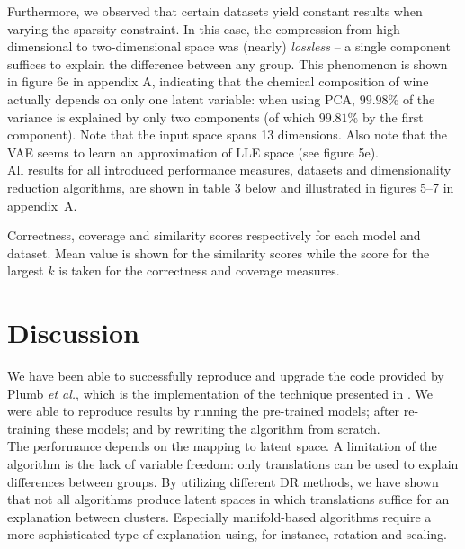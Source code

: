 Furthermore, we observed that certain datasets yield constant results when varying the sparsity-constraint. In this case, the compression from high-dimensional to two-dimensional space was (nearly) \textit{lossless} -- a single component suffices to explain the difference between any group. This phenomenon is shown in figure 6e in appendix A, indicating that the chemical composition of wine actually depends on only one latent variable: when using PCA, $99.98\%$ of the variance is explained by only two components (of which $99.81\%$ by the first component). Note that the input space spans 13 dimensions. Also note that the VAE seems to learn an approximation of LLE space (see figure 5e).\\

All results for all introduced performance measures, datasets and dimensionality reduction algorithms, are shown in table 3 below and illustrated in figures 5--7 in appendix~A.


\begin{table}[h]
  \begin{adjustwidth}{-3cm}{-3cm}
    \footnotesize
    \centering
    
  \end{adjustwidth}
  \caption{Correctness, coverage and similarity scores respectively for each model and dataset. Mean value is shown for the similarity scores while the score for the largest $k$ is taken for the correctness and coverage measures.}
\end{table}


\section{Discussion}
We have been able to successfully reproduce and upgrade the code provided by Plumb \textit{et al.}, which is the implementation of the technique presented in \citep{plumb2020explaining}. We were able to reproduce results by running the pre-trained models; after re-training these models; and by rewriting the algorithm from scratch.\\

The performance depends on the mapping to latent space. A limitation of the algorithm is the lack of variable freedom: only translations can be used to explain differences between groups. By utilizing different DR methods, we have shown that not all algorithms produce latent spaces in which translations suffice for an explanation between clusters. Especially manifold-based algorithms require a more sophisticated type of explanation using, for instance, rotation and scaling.\\

